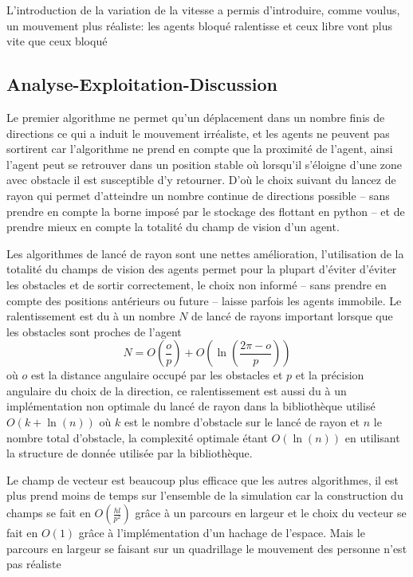\documentclass{article}
\begin{document}
L'introduction de la variation de la vitesse a permis d'introduire, comme voulus,
un mouvement plus réaliste: les agents bloqué ralentisse et ceux libre vont plus
vite que ceux bloqué


\subsection{Analyse-Exploitation-Discussion}

Le premier algorithme ne permet qu'un déplacement dans un nombre finis de directions
ce qui a induit le mouvement irréaliste, et les agents ne peuvent pas sortirent car
l'algorithme ne prend en compte que la proximité de l'agent, ainsi l'agent peut se
retrouver dans un position stable où lorsqu'il s'éloigne d'une zone avec obstacle
il est susceptible d'y retourner. D'où le choix suivant du lancez de rayon qui
permet d'atteindre un nombre continue de directions possible -- sans prendre
en compte la borne imposé par le stockage des flottant en python -- et de prendre
mieux en compte la totalité du champ de vision d'un agent.

Les algorithmes de lancé de rayon sont une nettes amélioration, l'utilisation
de la totalité du champs de vision des agents permet pour la plupart d'éviter
d'éviter les obstacles et de sortir correctement, le choix non informé --
sans prendre en compte des positions antérieurs ou future -- laisse parfois les
agents immobile. Le ralentissement est du à un nombre $N$ de lancé de rayons
important lorsque que les obstacles sont proches de l'agent
\[
  N = O\left(\frac{o}{p}\right) + O\left(\ln\left(\frac{2 \pi - o}{p}\right)\right)
\]
où $o$ est la distance angulaire occupé par les obstacles et $p$ et la précision angulaire
du choix de la direction, ce ralentissement est aussi du à un implémentation non optimale
du lancé de rayon dans la bibliothèque utilisé $O\left(k + \ln(n)\right)$ où $k$ est le nombre
d'obstacle sur le lancé de rayon et $n$ le nombre total d'obstacle, la complexité optimale
étant $O(\ln(n))$ en utilisant la structure de donnée utilisée par la bibliothèque.

Le champ de vecteur est beaucoup plus efficace que les autres algorithmes, il est
plus prend moins de temps sur l'ensemble de la simulation car la construction
du champs se fait en $O\left(\frac{h l}{p^2}\right)$ grâce à un parcours en largeur
et le choix du vecteur se fait en $O(1)$ grâce à l'implémentation d'un hachage de
l'espace. Mais le parcours en largeur se faisant sur un quadrillage le mouvement
des personne n'est pas réaliste
\end{document}
